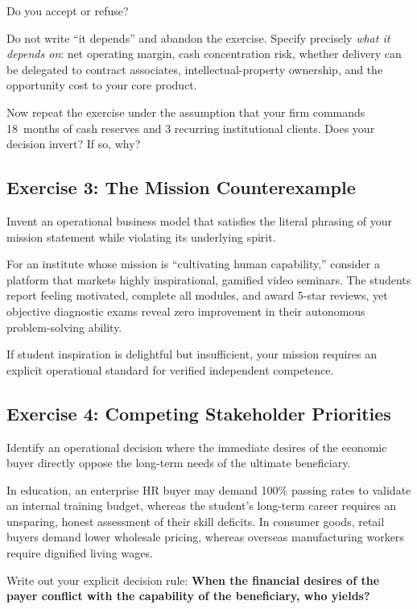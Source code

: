 Do you accept or refuse?

Do not write ``it depends'' and abandon the exercise. Specify precisely \textit{what it depends on}: net operating margin, cash concentration risk, whether delivery can be delegated to contract associates, intellectual-property ownership, and the opportunity cost to your core product.

Now repeat the exercise under the assumption that your firm commands 18~months of cash reserves and 3 recurring institutional clients. Does your decision invert? If so, why?

\subsection{Exercise 3: The Mission Counterexample}

Invent an operational business model that satisfies the literal phrasing of your mission statement while violating its underlying spirit.

For an institute whose mission is ``cultivating human capability,'' consider a platform that markets highly inspirational, gamified video seminars. The students report feeling motivated, complete all modules, and award 5-star reviews, yet objective diagnostic exams reveal zero improvement in their autonomous problem-solving ability.

If student inspiration is delightful but insufficient, your mission requires an explicit operational standard for verified independent competence.

\subsection{Exercise 4: Competing Stakeholder Priorities}

Identify an operational decision where the immediate desires of the economic buyer directly oppose the long-term needs of the ultimate beneficiary.

In education, an enterprise HR buyer may demand 100\% passing rates to validate an internal training budget, whereas the student's long-term career requires an unsparing, honest assessment of their skill deficits. In consumer goods, retail buyers demand lower wholesale pricing, whereas overseas manufacturing workers require dignified living wages.

Write out your explicit decision rule: \textbf{When the financial desires of the payer conflict with the capability of the beneficiary, who yields?}

